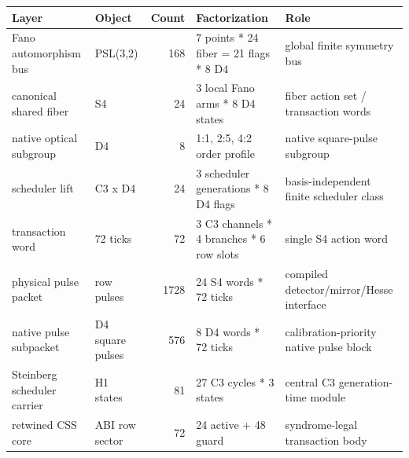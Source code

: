 \begin{center}\scriptsize
\begin{tabular}{p{}p{}r p{}p{}}
\toprule
Layer & Object & Count & Factorization & Role\\
\midrule
Fano automorphism bus & PSL(3,2) & 168 & 7 points * 24 fiber = 21 flags * 8 D4 & global finite symmetry bus\\
canonical shared fiber & S4 & 24 & 3 local Fano arms * 8 D4 states & fiber action set / transaction words\\
native optical subgroup & D4 & 8 & 1:1, 2:5, 4:2 order profile & native square-pulse subgroup\\
scheduler lift & C3 x D4 & 24 & 3 scheduler generations * 8 D4 flags & basis-independent finite scheduler class\\
transaction word & 72 ticks & 72 & 3 C3 channels * 4 branches * 6 row slots & single S4 action word\\
physical pulse packet & row pulses & 1728 & 24 S4 words * 72 ticks & compiled detector/mirror/Hesse interface\\
native pulse subpacket & D4 square pulses & 576 & 8 D4 words * 72 ticks & calibration-priority native pulse block\\
Steinberg scheduler carrier & H1 states & 81 & 27 C3 cycles * 3 states & central C3 generation-time module\\
retwined CSS core & ABI row sector & 72 & 24 active + 48 guard & syndrome-legal transaction body\\
\bottomrule
\end{tabular}
\end{center}
